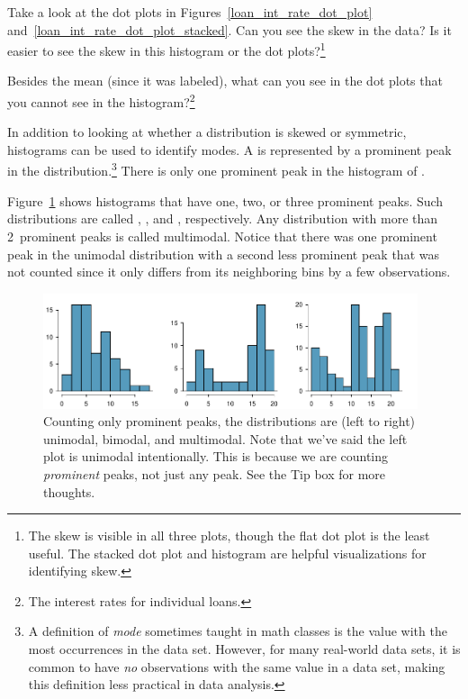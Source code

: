 \begin{exercise}
Take a look at the dot plots in
Figures~\ref{loan_int_rate_dot_plot}
and~\ref{loan_int_rate_dot_plot_stacked}.
Can you see the skew in the data? Is it easier to see the
skew in this histogram or the dot plots?\footnote{The skew
  is visible in all three plots, though the flat dot plot
  is the least useful.
  The stacked dot plot and histogram are helpful
  visualizations for identifying skew.}
\end{exercise}

\begin{exercise}
Besides the mean (since it was labeled), what can you see
in the dot plots that you cannot see in the
histogram?\footnote{The interest rates for individual loans.}
\end{exercise}

In addition to looking at whether a distribution is skewed
or symmetric, histograms can be used to identify modes.
A  is represented by a prominent peak in the
distribution.\footnote{A definition of \emph{mode} sometimes
  taught in math classes is the value with the
  most occurrences in the data set.
  However, for many real-world data sets, it is common to have
  \emph{no} observations with the same value in a data set,
  making this definition less practical in data analysis.}
There is only one prominent peak in the histogram of
.

Figure~\ref{singleBiMultiModalPlots} shows histograms that
have one, two, or three prominent peaks.
Such distributions are called
,
, and
, respectively.
Any distribution with more than 2~prominent peaks is
called multimodal.
Notice that there was one prominent peak in the unimodal
distribution with a second less prominent peak that was
not counted since it only differs from its neighboring
bins by a few observations.

\begin{figure}[h]
   \centering
   \includegraphics[width=0.98\textwidth]{ch_summarizing_data/figures/singleBiMultiModalPlots/singleBiMultiModalPlots}
   \caption{Counting only prominent peaks, the distributions are (left to right) unimodal, bimodal, and multimodal. Note that we've said the left plot is unimodal intentionally. This is because we are counting \emph{prominent} peaks, not just any peak. See the Tip box for more thoughts.}
   \label{singleBiMultiModalPlots}
\end{figure}


